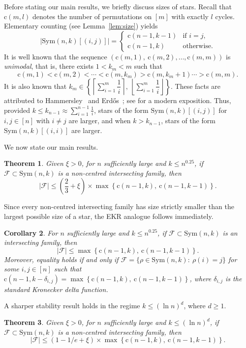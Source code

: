 \documentclass{amsart}
\newtheorem{thm}{Theorem}[section]
\newtheorem{cor}[thm]{Corollary}
\newcommand{\mcal}{\mathcal}
\newcommand{\sym}{\mathrm{Sym}}
\newcommand{\st}{\mathrm{c}}
\begin{document}
Before stating our main results, we briefly discuss sizes of stars. Recall that $\st(m,l)$ denotes  the number of permutations on $[m]$ with exactly $l$ cycles. Elementary counting (see Lemma~\ref{lem:size}) yields \[|\sym(n,k)[(i,j)]| = \begin{cases}    
 \st(n-1, k-1) & \text{if $i= j$,} \\[2ex]
 \st(n-1,k) & \text{otherwise.}
 \end{cases}\]
It is well known that the sequence $\left( \st(m,1),\ \st(m,2),\ldots, \st(m,m) \right)$ is {\it unimodal}, that is, there exists $1<k_{m}< m$ such that
\[\st(m,1)<\st(m,2)<\cdots<\st(m,k_{m})>\st(m,k_{m}+1)\cdots >\st(m,m).\] It is also known that 
$k_{m} \in \left\{\left\lceil\sum\limits_{i=1}^{m} \dfrac{1}{i} \right\rceil,\ \left\lfloor \sum\limits_{i=1}^{m} \dfrac{1}{i} \right\rfloor\right\}$. 
These facts are attributed to Hammersley~\cite{Ham} and Erd\H{o}s~\cite{Erdos}; see \cite{Sibuya} for a modern exposition.
Thus, provided $k\leq k_{n-1}\approx \sum\limits_{i=1}^{n-1} \frac{1}{i}$, stars of the form $\sym(n,k)[(i,j)]$ for $i,j\in [n]$ with $i\neq j$ are larger, and when $k>k_{n-1}$, stars of the form  $\sym(n,k)[(i,i)]$ are larger. 

We now state our main results.
\begin{thm}\label{thm:stability}
Given $\xi>0$, for $n$ sufficiently large and $k\leq n^{0.25}$, if $\mcal{F}\subset \sym(n,k)$ is a non-centred intersecting family, then 
\[|\mcal{F}| \leq \left(\dfrac{2}{3} +\xi\right)\times \max\left\{ \st(n-1,k),\ \st(n-1,k-1) \right\}.\]
\end{thm}

Since every non-centred intersecting family has size strictly smaller than the largest possible size of a star, the EKR analogue follows immediately.

\begin{cor}\label{cor:EKR}
For $n$ sufficiently large and $k\leq n^{0.25}$, if $\mcal{F}\subset \sym(n,k)$ is an intersecting family, then 
\[|\mcal{F}| \leq \max\left\{ \st(n-1,k),\ \st(n-1,k-1) \right\}.\] Moreover, equality holds if and only if $\mcal{F}=\{\rho \in \sym(n,k)\colon\ \rho(i)=j\}$ for some $i,j \in [n]$ such that $\st(n-1,k-\delta_{i,j})=\max\left\{ \st(n-1,k),\ \st(n-1,k-1) \right\}$, where $\delta_{i,j}$ is the standard Kronecker delta function.
\end{cor}
A sharper stability result holds in the regime $k\leq (\ln n)^d$, where $d\geq 1$. 

\begin{thm}\label{thm:stabilityln}
Given $\xi>0$, for $n$ sufficiently large and $k\leq (\ln n)^{d}$, if $\mcal{F}\subset \sym(n,k)$ is a non-centred intersecting family, then 
\[|\mcal{F}| \leq \left(1-1/e +\xi\right)\times \max\left\{ \st(n-1,k),\ \st(n-1,k-1) \right\}.\]
\end{thm}
\end{document}
